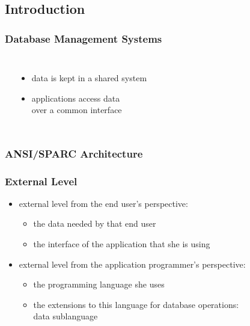 \documentclass[dvipsnames]{beamer}
\theoremstyle{plain}
\begin{document}
\subsection{Introduction}

\begin{frame}
  \frametitle{Database Management Systems}

  \begin{columns}[b]
    \begin{center}
    \end{center}

    \begin{itemize}
      \item data is kept in a shared system
      \item applications access data\\
	over a common interface
    \end{itemize}
  \end{columns}
\end{frame}

\begin{frame}
  \frametitle{ANSI/SPARC Architecture}

  \begin{center}
  \end{center}
\end{frame}

\begin{frame}
  \frametitle{External Level}

  \begin{itemize}
    \item external level from the end user's perspective:
    \begin{itemize}
      \item the data needed by that end user
      \item the interface of the application that she is using
    \end{itemize}

    \pause
    \bigskip
    \item external level from the application programmer's perspective:
    \begin{itemize}
      \item the programming language she uses
      \item the extensions to this language for database operations:\\
        \alert{data sublanguage}
    \end{itemize}
  \end{itemize}
\end{frame}
\end{document}
